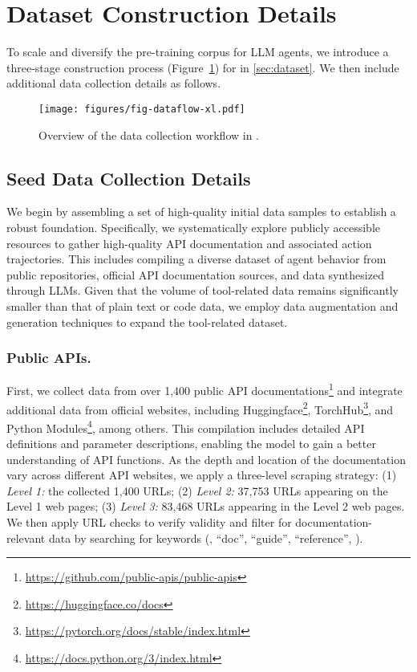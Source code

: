 \section{Dataset Construction Details}
\label{app:datacollection}
To scale and diversify the pre-training corpus for LLM agents, we introduce a three-stage construction process (Figure~\ref{fig:dataprepare}) for \dataset in \cref{sec:dataset}. We then include additional data collection details as follows.

\begin{figure}[ht]
  \centering
  \texttt{[image: figures/fig-dataflow-xl.pdf]}
  \caption{Overview of the data collection workflow in \dataset.  }
  \label{fig:dataprepare}
\end{figure}

\subsection{Seed Data Collection Details}
\label{app:4-1}

We begin by assembling a set of high-quality initial data samples to establish a robust foundation.
Specifically, we systematically explore publicly accessible resources to gather high-quality API documentation and associated action trajectories. This includes compiling a diverse dataset of agent behavior from public repositories, official API documentation sources, and data synthesized through LLMs.
Given that the volume of tool-related data remains significantly smaller than that of plain text or code data, we employ data augmentation and generation techniques to expand the tool-related dataset.

\subsubsection{Public APIs.}
First, we collect data from over 1,400 public API documentations\footnote{\url{https://github.com/public-apis/public-apis}} and integrate additional data from official websites, including Huggingface\footnote{\url{https://huggingface.co/docs}}, TorchHub\footnote{\url{https://pytorch.org/docs/stable/index.html}}, and Python Modules\footnote{\url{https://docs.python.org/3/index.html}}, among others.
This compilation includes detailed API definitions and parameter descriptions, enabling the model to gain a better understanding of API functions.
As the depth and location of the documentation vary across different API websites, we apply a three-level scraping strategy: 
(1) \emph{Level 1:} the collected 1,400 URLs; 
(2) \emph{Level 2:} 37,753 URLs appearing on the Level 1 web pages; 
(3) \emph{Level 3:} 83,468 URLs appearing in the Level 2 web pages. 
We then apply URL checks to verify validity and filter for documentation-relevant data by searching for keywords (\eg, ``doc'', ``guide'', ``reference'', \etc).

